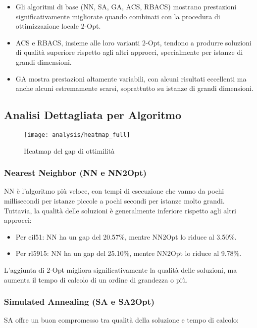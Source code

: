 \begin{itemize}
	\item Gli algoritmi di base (NN, SA, GA, ACS, RBACS) mostrano prestazioni significativamente migliorate quando combinati con la procedura di ottimizzazione locale 2-Opt.
	\item ACS e RBACS, insieme alle loro varianti 2-Opt, tendono a produrre soluzioni di qualità superiore rispetto agli altri approcci, specialmente per istanze di grandi dimensioni.
	\item GA mostra prestazioni altamente variabili, con alcuni risultati eccellenti ma anche alcuni estremamente scarsi, soprattutto su istanze di grandi dimensioni.
\end{itemize}

\subsection{Analisi Dettagliata per Algoritmo}


\begin{figure}
	\begin{center}
		\texttt{[image: analysis/heatmap\_full]}
	\end{center}
	\caption{Heatmap del gap di ottimilità}\label{fig:heatmap_full}
\end{figure}

\subsubsection{Nearest Neighbor (NN e NN2Opt)}
NN è l'algoritmo più veloce, con tempi di esecuzione che vanno da pochi millisecondi per istanze piccole a pochi secondi per istanze molto grandi. Tuttavia, la qualità delle soluzioni è generalmente inferiore rispetto agli altri approcci:

\begin{itemize}
	\item Per eil51: NN ha un gap del 20.57\%, mentre NN2Opt lo riduce al 3.50\%.
	\item Per rl5915: NN ha un gap del 25.10\%, mentre NN2Opt lo riduce al 9.78\%.
\end{itemize}

L'aggiunta di 2-Opt migliora significativamente la qualità delle soluzioni, ma aumenta il tempo di calcolo di un ordine di grandezza o più.

\subsubsection{Simulated Annealing (SA e SA2Opt)}
SA offre un buon compromesso tra qualità della soluzione e tempo di calcolo:

